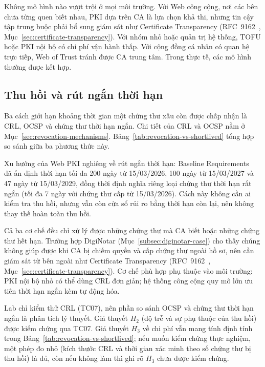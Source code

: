 Không mô hình nào vượt trội ở mọi môi trường. Với Web công cộng, nơi các bên chưa từng quen biết nhau, PKI dựa trên CA là lựa chọn khả thi, nhưng tin cậy tập trung buộc phải bổ sung giám sát như Certificate Transparency (RFC~9162~\cite{rfc9162}, Mục~\ref{sec:certificate-transparency}). Với nhóm nhỏ hoặc quản trị hệ thống, TOFU hoặc PKI nội bộ có chi phí vận hành thấp. Với cộng đồng cá nhân có quan hệ trực tiếp, Web of Trust tránh được CA trung tâm. Trong thực tế, các mô hình thường được kết hợp.

\subsection{Thu hồi và rút ngắn thời hạn}
\label{subsec:revocation-vs-short-lived}

Ba cách giới hạn khoảng thời gian một chứng thư xấu còn được chấp nhận là CRL, OCSP và chứng thư thời hạn ngắn. Chi tiết của CRL và OCSP nằm ở Mục~\ref{sec:revocation-mechanisms}. Bảng~\ref{tab:revocation-vs-shortlived} tổng hợp so sánh giữa ba phương thức này.



Xu hướng của Web PKI nghiêng về rút ngắn thời hạn: Baseline Requirements~\cite{cabforum_br} đã ấn định thời hạn tối đa 200 ngày từ 15/03/2026, 100 ngày từ 15/03/2027 và 47 ngày từ 15/03/2029, đồng thời định nghĩa riêng loại chứng thư thời hạn rất ngắn (tối đa 7 ngày với chứng thư cấp từ 15/03/2026). Cách này không cần ai kiểm tra thu hồi, nhưng vẫn còn cửa sổ rủi ro bằng thời hạn còn lại, nên không thay thế hoàn toàn thu hồi.

Cả ba cơ chế đều chỉ xử lý được những chứng thư mà CA biết hoặc những chứng thư hết hạn. Trường hợp DigiNotar (Mục~\ref{subsec:diginotar-case}) cho thấy chúng không giúp được khi CA bị chiếm quyền và cấp chứng thư ngoài hồ sơ, nên cần giám sát từ bên ngoài như Certificate Transparency (RFC~9162~\cite{rfc9162}, Mục~\ref{sec:certificate-transparency}). Cơ chế phù hợp phụ thuộc vào môi trường: PKI nội bộ nhỏ có thể dùng CRL đơn giản; hệ thống công cộng quy mô lớn ưu tiên thời hạn ngắn kèm tự động hóa.

Lab chỉ kiểm thử CRL (TC07), nên phần so sánh OCSP và chứng thư thời hạn ngắn là phân tích lý thuyết. Giả thuyết $H_2$ (độ trễ và sự phụ thuộc của thu hồi) được kiểm chứng qua TC07. Giả thuyết $H_3$ về chi phí vẫn mang tính định tính trong Bảng~\ref{tab:revocation-vs-shortlived}; nếu muốn kiểm chứng thực nghiệm, một phép đo nhỏ (kích thước CRL và thời gian xác minh theo số chứng thư bị thu hồi) là đủ, còn nếu không làm thì ghi rõ $H_3$ chưa được kiểm chứng.

